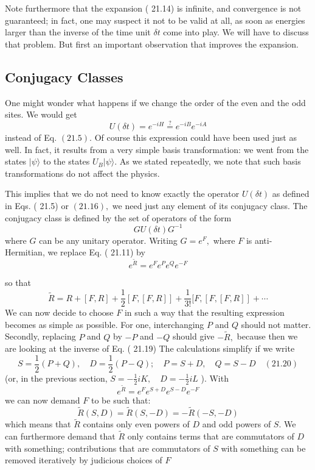 \documentclass[main.tex]{subfiles}
\begin{document}
Note furthermore that the expansion ( 21.14) is infinite, and convergence is not guaranteed; in fact, one may suspect it not to be valid at all, as soon as energies larger than the inverse of the time unit $\delta t$ come into play. We will have to discuss that problem. But first an important observation that improves the expansion.


\subsection{Conjugacy Classes}\label{ch21.3}

One might wonder what happens if we change the order of the even and the odd sites. We would get
$$
U(\delta t)=e^{-i H} \stackrel{?}{=} e^{-i B} e^{-i A}
$$
instead of Eq. $(21.5) .$ Of course this expression could have been used just as well. In fact, it results from a very simple basis transformation: we went from the states $|\psi\rangle$ to the states $U_{B}|\psi\rangle .$ As we stated repeatedly, we note that such basis transformations do not affect the physics.

This implies that we do not need to know exactly the operator $U(\delta t)$ as defined in Eqs. ( 21.5) or $(21.16),$ we need just any element of its conjugacy class. The conjugacy class is defined by the set of operators of the form
$$
G U(\delta t) G^{-1}
$$
where $G$ can be any unitary operator. Writing $G=e^{F},$ where $F$ is anti-Hermitian, we replace Eq. ( 21.11) by
$$
e^{\tilde{R}}=e^{F} e^{P} e^{Q} e^{-F}
$$

so that
$$
\tilde{R}=R+[F, R]+\frac{1}{2}[F,[F, R]]+\frac{1}{3 !}[F,[F,[F, R]]+\cdots
$$
We can now decide to choose $F$ in such a way that the resulting expression becomes as simple as possible. For one, interchanging $P$ and $Q$ should not matter. Secondly, replacing $P$ and $Q$ by $-P$ and $-Q$ should give $-\tilde{R},$ because then we are looking at the inverse of Eq. ( 21.19) The calculations simplify if we write
$$
S=\frac{1}{2}(P+Q), \quad D=\frac{1}{2}(P-Q) ; \quad P=S+D, \quad Q=S-D \quad(21.20)
$$
(or, in the previous section, $S=-\frac{1}{2} i K, \quad D=-\frac{1}{2} i L$ ). With
$$
e^{\tilde{R}}=e^{F} e^{S+D} e^{S-D} e^{-F}
$$
we can now demand $F$ to be such that:
$$
\tilde{R}(S, D)=\tilde{R}(S,-D)=-\tilde{R}(-S,-D)
$$
which means that $\tilde{R}$ contains only even powers of $D$ and odd powers of $S .$ We can furthermore demand that $\tilde{R}$ only contains terms that are commutators of $D$ with something; contributions that are commutators of $S$ with something can be removed iteratively by judicious choices of $F$
\end{document}

